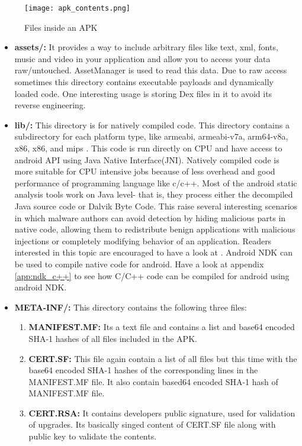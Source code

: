 \documentclass[../main.tex]{subfile}
\begin{document}
		\begin{figure}[h]
			\centering
			\texttt{[image: apk\_contents.png]}
			\caption{Files inside an APK}
		\end{figure}
		
		\begin{itemize}
			\item \textbf{assets/:} It provides a way to include arbitrary files like text, xml, fonts, music and video in your application and allow you to access your data raw/untouched. AssetManager is used to read this data\cite{android_assets}. Due to raw access sometimes this directory contains executable payloads and dynamically loaded code. One interesting usage is storing Dex files in it to avoid its reverse engineering. \cite{lim2016android}
			
			\item \textbf{lib/:} This directory is for natively compiled code. This directory contains a subdirectory for each platform type, like armeabi, armeabi-v7a, arm64-v8a, x86, x86, and mips \cite{APK_structure}. This code is run directly on CPU and have access to android API using Java Native Interface(JNI). Natively compiled code is more suitable for CPU intensive jobs because of less overhead and good performance of programming language like c/c++. Most of the android  static analysis tools work on Java level- that is, they process either the decompiled Java source code or Dalvik Byte Code\cite{afonso2016going}. This raise several interesting scenarios in which malware authors can avoid detection by hiding malicious parts in native code, allowing them to redistribute benign applications with malicious injections or completely modifying behavior of an application. Readers interested in this topic are encouraged to have a look at \cite{afonso2016going}. Android NDK can be used to compile native code for android. Have a look at appendix \ref{app:ndk_c++} to see how C/C++ code can be compiled for android using android NDK.
			
			
			\item \textbf{META-INF/:} This directory contains the following three files:
			\begin{enumerate}
				\item \textbf{MANIFEST.MF:} Its a text file and contains a list and base64 encoded SHA-1 hashes of all files included in the APK.
				\item \textbf{CERT.SF:} This file again contain a list of all files but this time with the base64 encoded SHA-1 hashes of the corresponding lines in the MANIFEST.MF file. It also contain based64 encoded SHA-1 hash of MANIFEST.MF file.
				\item \textbf{CERT.RSA:} It contains developers public signature, used for validation of upgrades. Its basically singed content of CERT.SF file along with public key to validate the contents.
			\end{enumerate}
			

\end{itemize}
\end{document}
